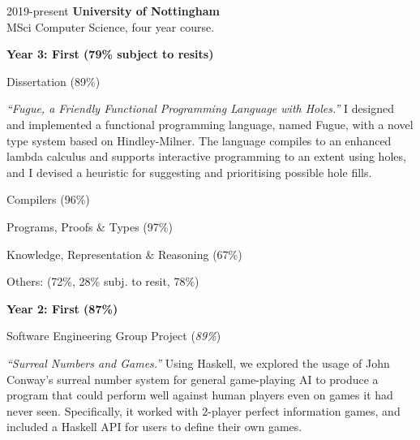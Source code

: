 \documentclass[12pt]{article}
\begin{document}
\begin{explist}
	\item[2019-present] \textbf{University of Nottingham} \\
		  MSci Computer Science, four year course.
		  {\small
		  \begin{explist}
    		  \item[] \textbf{Year 3: First (79\% subject to resits)}
		  	\begin{explist}
    		      \item Dissertation (89\%)
		      	\begin{explist}
    		          \item \textit{``Fugue, a Friendly Functional Programming Language with Holes.''}
I designed and implemented a functional programming language, named Fugue, with a novel type system based on Hindley-Milner. The language compiles to an enhanced lambda calculus and supports interactive programming to an extent using holes, and I devised a heuristic for suggesting and prioritising possible hole fills.
		          \end{explist}
		          \begin{multicols}{2}
				     \item Compilers (96\%)
				     \item Programs, Proofs \& Types (97\%)
				     \item Knowledge, Representation \& Reasoning (67\%)
				     \item Others: (72\%, 28\% subj. to resit, 78\%)
				     \end{multicols}
		        \end{explist}
    		   \item[] \textbf{Year 2: First (87\%)}
		   		\begin{explist}
    		          \item Software Engineering Group Project (\textit{89\%})
		          	  \begin{explist}
    		  		     \item \textit{``Surreal Numbers and Games.''} Using Haskell, we explored the usage of John Conway's surreal number system for general game-playing AI to produce a program that could perform well against human players even on games it had never seen. Specifically, it worked with 2-player perfect information games, and included a Haskell API for users to define their own games.
				     \end{explist}


\end{explist}
\end{explist}}
\end{explist}
\end{document}
